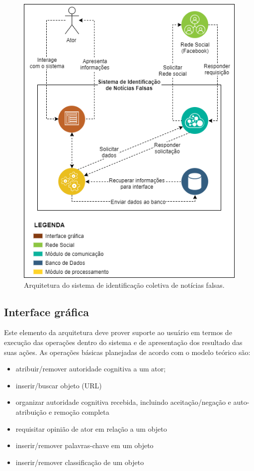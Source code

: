 \begin{figure}[ht]
\centering
\includegraphics[scale=0.6]{4-proposta/arquitetura_do_sistema.png}
\caption{Arquitetura do sistema de identificação coletiva de notícias falsas.}
\label{fig:arquitetura_sist_id_not_falsas}
\end{figure}

\subsection{Interface gráfica}
Este elemento da arquitetura deve prover suporte ao usuário em termos de execução das operações dentro do sistema e de apresentação dos resultado das suas ações. As operações básicas planejadas de acordo com o modelo teórico são:

\begin{itemize}
    \item atribuir/remover autoridade cognitiva a um ator;
    \item inserir/buscar objeto (URL)
    \item organizar autoridade cognitiva recebida, incluindo aceitação/negação e auto-atribuição e remoção completa
    \item requisitar opinião de ator em relação a um objeto
    \item inserir/remover palavras-chave em um objeto
    \item inserir/remover classificação de um objeto
\end{itemize}

